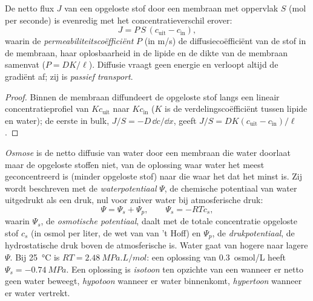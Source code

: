 \begin{theorem}\label{thm:b1:membranes-transport:fick}
De netto flux $J$ van een opgeloste stof door een membraan met oppervlak $S$ (mol
per seconde) is evenredig met het concentratieverschil erover:
\[
J = P\,S\,(c_{\text{uit}} - c_{\text{in}}),
\]
waarin de \emph{permeabiliteitscoëfficiënt} $P$ (in \unit{m/s}) de
diffusiecoëfficiënt van de stof in de membraan, haar oplosbaarheid in de lipide
en de dikte van de membraan samenvat ($P = DK/\ell$). Diffusie vraagt geen
energie en verloopt altijd de gradiënt af; zij is
\emph{passief transport}.
\end{theorem}
\begin{proof}
Binnen de membraan diffundeert de opgeloste stof langs een lineair
concentratieprofiel van $Kc_{\text{uit}}$ naar $Kc_{\text{in}}$ ($K$ is de
verdelingscoëfficiënt tussen lipide en water); de eerste  in bulk,
$J/S = -D\,\dd c/\dd x$, geeft $J/S = DK(c_{\text{uit}} -
c_{\text{in}})/\ell$.
\end{proof}

\begin{definition}\label{def:b1:membranes-transport:osmosis}
\emph{Osmose} is de netto diffusie van water door een membraan die
water doorlaat maar de opgeloste stoffen niet, van de oplossing waar water het
meest geconcentreerd is (minder opgeloste stof) naar die waar het dat het minst
is. Zij wordt beschreven met de \emph{waterpotentiaal}
$\Psi$, de chemische potentiaal van water uitgedrukt als een druk, nul voor
zuiver water bij atmosferische druk:
\[
\Psi = \Psi_s + \Psi_p, \qquad \Psi_s = -RTc_s ,
\]
waarin $\Psi_s$, de \emph{osmotische potentiaal},
daalt met de totale concentratie opgeloste stof $c_s$ (in osmol per liter, de wet
van van 't Hoff) en $\Psi_p$, de \emph{drukpotentiaal}, de
hydrostatische druk boven de atmosferische is. Water gaat van hogere naar lagere
$\Psi$. Bij \qty{25}{\celsius} is $RT = \qty{2.48}{MPa.L/mol}$: een oplossing van
\qty{0.3}{osmol/L} heeft $\Psi_s = \qty{-0.74}{MPa}$. Een oplossing is
\emph{isotoon} ten opzichte van een  wanneer er netto geen water
beweegt, \emph{hypotoon} wanneer er water binnenkomt, \emph{hypertoon} wanneer er
water vertrekt.
\end{definition}

